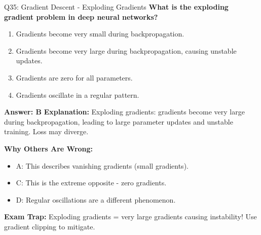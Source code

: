 \documentclass[8pt]{beamer}
\begin{document}
	\begin{frame}{Q35: Gradient Descent - Exploding Gradients}
		\fontsize{6.5}{7.5}\selectfont
		\textbf{What is the exploding gradient problem in deep neural networks?}
		
		\begin{enumerate}
			\item Gradients become very small during backpropagation.
			\item Gradients become very large during backpropagation, causing unstable updates.
			\item Gradients are zero for all parameters.
			\item Gradients oscillate in a regular pattern.
		\end{enumerate}
		
		\vspace{0.05cm}
		\textcolor{myblue}{\textbf{Answer: B}}
		\vspace{0.05cm}
		\textcolor{myblue}{\textbf{Explanation:}} Exploding gradients: gradients become very large during backpropagation, leading to large parameter updates and unstable training. Loss may diverge.
		
		\vspace{0.05cm}
		\textcolor{myred}{\textbf{Why Others Are Wrong:}}
		\begin{itemize}
			\item \textcolor{myred}{A:} This describes vanishing gradients (small gradients).
			\item \textcolor{myred}{C:} This is the extreme opposite - zero gradients.
			\item \textcolor{myred}{D:} Regular oscillations are a different phenomenon.
		\end{itemize}
		
		\textcolor{myred}{\textbf{Exam Trap:}} Exploding gradients = \textcolor{myblue}{very large gradients} causing instability! Use gradient clipping to mitigate.
	\end{frame}
	
	
\end{document}
